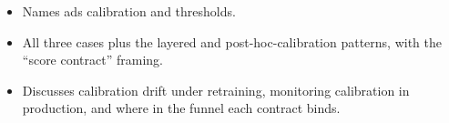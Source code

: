 \begin{interviewq}
\goodgreat
\begin{itemize}
    \item {} Names ads calibration and thresholds.
    \item {} All three cases plus the layered and post-hoc-calibration patterns, with the ``score contract'' framing.
    \item {} Discusses calibration drift under retraining, monitoring calibration in production, and where in the funnel each contract binds.
\end{itemize}

\end{interviewq}

